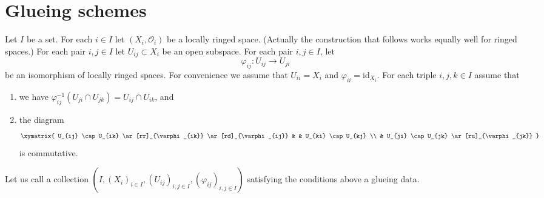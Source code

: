 \section{Glueing schemes}
\label{section-glueing-schemes}

\noindent
Let $I$ be a set.
For each $i \in I$ let $(X_i, \mathcal{O}_i)$ be
a locally ringed space. (Actually the construction that
follows works equally well for ringed spaces.)
For each pair $i, j \in I$ let $U_{ij} \subset X_i$
be an open subspace.
For each pair $i, j \in I$, let
$$
\varphi_{ij} : U_{ij} \to U_{ji}
$$
be an isomorphism of locally ringed spaces.
For convenience we assume that $U_{ii} = X_i$ and
$\varphi_{ii} = \text{id}_{X_i}$.
For each triple $i, j, k \in I$ assume that
\begin{enumerate}
\item we have
$\varphi_{ij}^{-1}(U_{ji} \cap U_{jk}) =  U_{ij} \cap U_{ik}$, and
\item the diagram
$$
\xymatrix{
U_{ij} \cap U_{ik} \ar[rr]_{\varphi_{ik}} \ar[rd]_{\varphi_{ij}} & &
U_{ki} \cap U_{kj} \\
& U_{ji} \cap U_{jk} \ar[ru]_{\varphi_{jk}}
}
$$
is commutative.
\end{enumerate}
Let us call a collection
$(I, (X_i)_{i\in I}, (U_{ij})_{i, j\in I}, (\varphi_{ij})_{i, j\in I})$
satisfying the conditions above a glueing data.

